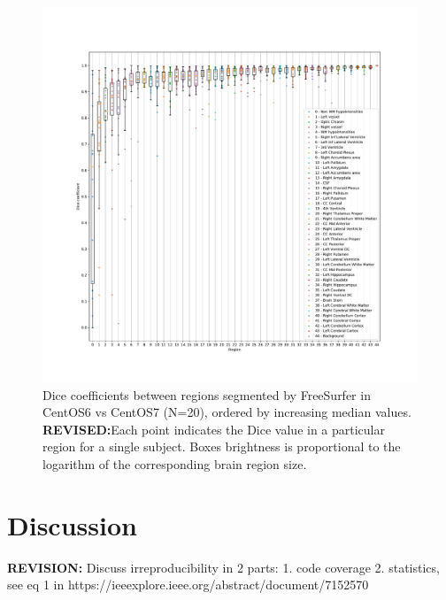 \documentclass[a4paper,num-refs]{oup-contemporary}
\newcommand{\revision}[1]{\color{purple}\textbf{REVISION:}#1\color{black}}
\newcommand{\revised}[1]{\color{blue}\textbf{REVISED:}#1\color{black}}
\begin{document}
\begin{figure}
  \hspace*{-1cm}
  \includegraphics[width=1.1\linewidth]{figures/dice_regions.pdf}
    \caption{Dice coefficients between regions segmented by FreeSurfer in CentOS6 vs CentOS7 (N=20), ordered by increasing 
    median values. 
    \revised{Each point indicates the Dice value in a particular region for a single subject.}
    Boxes brightness is proportional to the logarithm of the corresponding brain region size.}
    \label{fig:scatter_plot}
  \end{figure}

  

\section{Discussion}

\revision{
Discuss irreproducibility in 2 parts:
1. code coverage 
2. statistics, see eq 1 in https://ieeexplore.ieee.org/abstract/document/7152570
}
\end{document}

